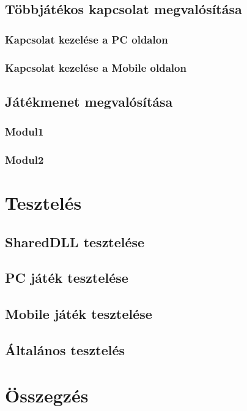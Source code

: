 \documentclass[]{thesis-ekf}
\theoremstyle{definition}
\theoremstyle{remark}
\begin{document}
\section{Többjátékos kapcsolat megvalósítása}

\subsection{Kapcsolat kezelése a PC oldalon}
\subsection{Kapcsolat kezelése a Mobile oldalon}

\section{Játékmenet megvalósítása}

\subsection{Modul1}
\subsection{Modul2}

\chapter{Tesztelés}

\section{SharedDLL tesztelése}
\section{PC játék tesztelése}
\section{Mobile játék tesztelése}
\section{Általános tesztelés}

\chapter*{Összegzés}
\end{document}
